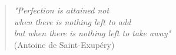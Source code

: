 
%
%
%

\thispagestyle{empty}
\vspace*{3.5cm}
\begin{flushright}
{\large
\begin{verse}
  \begin{flushright}
    \textit{"Perfection is attained not\\
      when there is nothing left to add\\
      but when there is nothing left to take away"}\\

    (Antoine de Saint-Exup\'{e}ry)
  \end{flushright}
\end{verse}}
\end{flushright}



